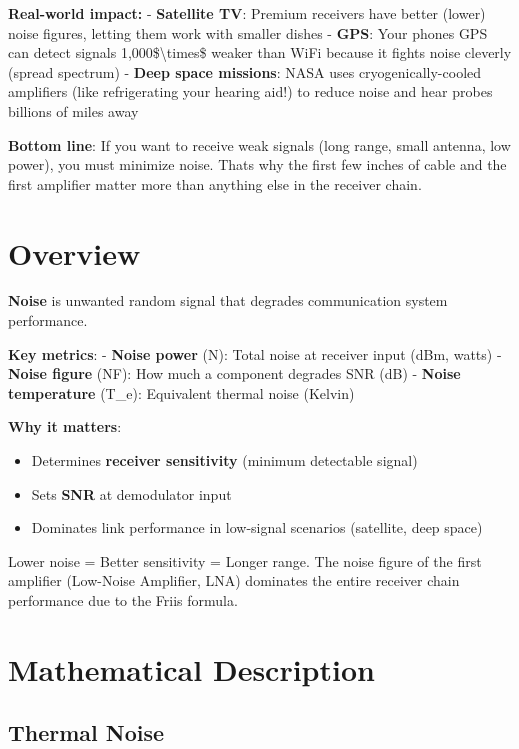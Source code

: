 \begin{nontechnical}
\textbf{Real-world impact:} - \textbf{Satellite TV}: Premium receivers
have better (lower) noise figures, letting them work with smaller dishes
- \textbf{GPS}: Your phone\textquotesingle s GPS can detect signals
1,000\$\textbackslash times\$ weaker than WiFi because it fights noise
cleverly (spread spectrum) - \textbf{Deep space missions}: NASA uses
cryogenically-cooled amplifiers (like refrigerating your hearing aid!)
to reduce noise and hear probes billions of miles away

\textbf{Bottom line}: If you want to receive weak signals (long range,
small antenna, low power), you must minimize noise.
That\textquotesingle s why the first few inches of cable and the first
amplifier matter more than anything else in the receiver chain.
\end{nontechnical}

\section{Overview}

\textbf{Noise} is unwanted random signal that degrades communication
system performance.

\textbf{Key metrics}: - \textbf{Noise power} (N): Total noise at
receiver input (dBm, watts) - \textbf{Noise figure} (NF): How much a
component degrades SNR (dB) - \textbf{Noise temperature} (T\_e):
Equivalent thermal noise (Kelvin)

\textbf{Why it matters}:
\begin{itemize}
\item Determines \textbf{receiver sensitivity} (minimum detectable signal)
\item Sets \textbf{SNR} at demodulator input
\item Dominates link performance in low-signal scenarios (satellite, deep space)
\end{itemize}

\begin{keyconcept}
Lower noise = Better sensitivity = Longer range. The noise figure of the first amplifier (Low-Noise Amplifier, LNA) dominates the entire receiver chain performance due to the Friis formula.
\end{keyconcept}

\section{Mathematical Description}

\subsection{Thermal Noise}

